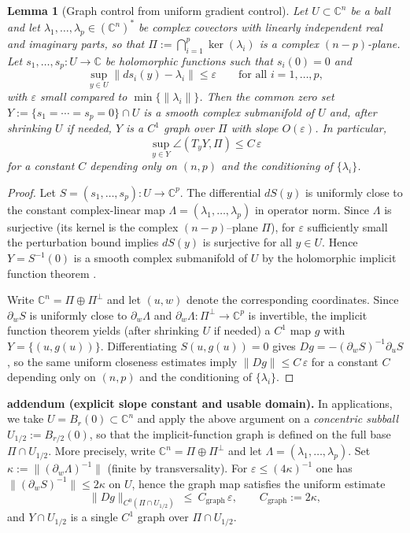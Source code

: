 \documentclass[11pt]{article}
\newcommand{\REVMZ}[1]{\textcolor{teal}{#1}}  %
\numberwithin{equation}{section}  %
\theoremstyle{plain}
\newtheorem{lemma}[theorem]{Lemma}
\theoremstyle{definition}
\theoremstyle{remark}
\newcommand{\C}{\mathbb{C}}
\begin{document}
\begin{lemma}[Graph control from uniform gradient control]\label{lem:graph-from-grad}\label{lem:linear-graph-geometry}
Let $U\subset\C^n$ be a ball and let $\lambda_1,\dots,\lambda_p\in(\C^n)^*$ be complex covectors with linearly independent real and imaginary parts,
so that $\Pi:=\bigcap_{i=1}^p \ker(\lambda_i)$ is a complex $(n-p)$-plane.
Let $s_1,\dots,s_p:U\to\C$ be holomorphic functions such that $s_i(0)=0$ and
\[
\sup_{y\in U}\|ds_i(y)-\lambda_i\|\le \varepsilon
\qquad\text{for all }i=1,\dots,p,
\]
with $\varepsilon$ small compared to $\min\{\|\lambda_i\|\}$.
Then the common zero set $Y:=\{s_1=\cdots=s_p=0\}\cap U$ is a smooth complex submanifold of $U$ and, after shrinking $U$ if needed,
$Y$ is a $C^1$ graph over $\Pi$ with slope $O(\varepsilon)$.
In particular,
\[
\sup_{y\in Y}\angle(T_yY,\Pi)\le C\,\varepsilon
\]
for a constant $C$ depending only on $(n,p)$ and the conditioning of $\{\lambda_i\}$.
\end{lemma}


\begin{proof}
Let $S=(s_1,\dots,s_p):U\to\C^p$.  The differential $dS(y)$ is uniformly close to the constant complex-linear map
$\Lambda=(\lambda_1,\dots,\lambda_p)$ in operator norm.  Since $\Lambda$ is surjective (its kernel is the complex $(n-p)$--plane $\Pi$),
for $\varepsilon$ sufficiently small the perturbation bound implies $dS(y)$ is surjective for all $y\in U$.
Hence $Y=S^{-1}(0)$ is a smooth complex submanifold of $U$ by the holomorphic implicit function theorem \REVMZ{\cite{GH78}}.

Write $\C^n=\Pi\oplus \Pi^\perp$ and let $(u,w)$ denote the corresponding coordinates.
Since $\partial_w S$ is uniformly close to $\partial_w\Lambda$ and $\partial_w\Lambda:\Pi^\perp\to\C^p$ is invertible,
the implicit function theorem yields (after shrinking $U$ if needed) a $C^1$ map $g$ with $Y=\{(u,g(u))\}$.
Differentiating $S(u,g(u))=0$ gives $Dg=-(\partial_w S)^{-1}\partial_u S$, so the same uniform closeness estimates imply
$\|Dg\|\le C\,\varepsilon$ for a constant $C$ depending only on $(n,p)$ and the conditioning of $\{\lambda_i\}$.
\end{proof}


\noindent\textbf{addendum (explicit slope constant and usable domain).}
In applications, we take $U=B_r(0)\subset\C^n$ and apply the above argument on a \emph{concentric subball}
$U_{1/2}:=B_{r/2}(0)$, so that the implicit-function graph is defined on the full base $\Pi\cap U_{1/2}$.
More precisely, write $\C^n=\Pi\oplus\Pi^\perp$ and let $\Lambda=(\lambda_1,\dots,\lambda_p)$.
Set $\kappa:=\|(\partial_w\Lambda)^{-1}\|$ (finite by transversality). For $\varepsilon\le (4\kappa)^{-1}$ one has
$\|(\partial_wS)^{-1}\|\le 2\kappa$ on $U$, hence the graph map satisfies the uniform estimate
\[
\|Dg\|_{C^0(\Pi\cap U_{1/2})}\ \le\ C_{\mathrm{graph}}\,\varepsilon,
\qquad C_{\mathrm{graph}}:=2\kappa,
\]
and $Y\cap U_{1/2}$ is a single $C^1$ graph over $\Pi\cap U_{1/2}$.
\end{document}
